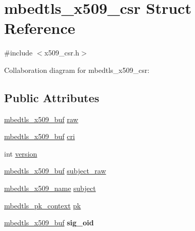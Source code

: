 \hypertarget{structmbedtls__x509__csr}{}\section{mbedtls\+\_\+x509\+\_\+csr Struct Reference}
\label{structmbedtls__x509__csr}


{\ttfamily \#include $<$x509\+\_\+csr.\+h$>$}



Collaboration diagram for mbedtls\+\_\+x509\+\_\+csr\+:
\subsection*{Public Attributes}
\begin{DoxyCompactItemize}
\item 
\mbox{\hyperlink{group__x509__module_ga4d02c9e8e4e2934555e0d132cd2976dc}{mbedtls\+\_\+x509\+\_\+buf}} \mbox{\hyperlink{structmbedtls__x509__csr_ad3c60458143eb1ddedfa573466931a70}{raw}}
\item 
\mbox{\hyperlink{group__x509__module_ga4d02c9e8e4e2934555e0d132cd2976dc}{mbedtls\+\_\+x509\+\_\+buf}} \mbox{\hyperlink{structmbedtls__x509__csr_a6adcb10c37a6bc946310d54567468f8a}{cri}}
\item 
int \mbox{\hyperlink{structmbedtls__x509__csr_a455e44fb96cdcd346788e0a41d7ab2b5}{version}}
\item 
\mbox{\hyperlink{group__x509__module_ga4d02c9e8e4e2934555e0d132cd2976dc}{mbedtls\+\_\+x509\+\_\+buf}} \mbox{\hyperlink{structmbedtls__x509__csr_ad85a7b3987a80254911b8d48a1beb78f}{subject\+\_\+raw}}
\item 
\mbox{\hyperlink{group__x509__module_ga2272228c7776102328df31623af3168c}{mbedtls\+\_\+x509\+\_\+name}} \mbox{\hyperlink{structmbedtls__x509__csr_a0c403df635495f8cba9b3e1001fc4491}{subject}}
\item 
\mbox{\hyperlink{structmbedtls__pk__context}{mbedtls\+\_\+pk\+\_\+context}} \mbox{\hyperlink{structmbedtls__x509__csr_abacfec387e945f59a35a106eebba0a1c}{pk}}
\item 
\mbox{\label{structmbedtls__x509__csr_a2d9ee56aee03832cb531eb78a53224f4}} 
\mbox{\hyperlink{group__x509__module_ga4d02c9e8e4e2934555e0d132cd2976dc}{mbedtls\+\_\+x509\+\_\+buf}} {\bfseries sig\+\_\+oid}
\item 
\mbox{\label{structmbedtls__x509__csr_a2ba91f0de1e1002cb569db90781f954c}} 

\end{DoxyCompactItemize}
